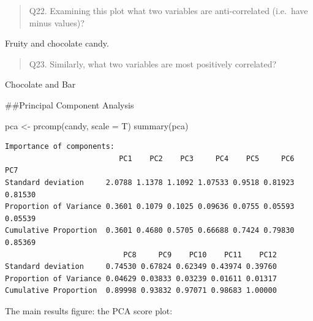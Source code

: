 \documentclass[
  letterpaper,
  DIV=11,
  numbers=noendperiod]{scrartcl}
\newenvironment{Shaded}{\begin{snugshade}}{\end{snugshade}}
\newcommand{\AttributeTok}[1]{\textcolor[rgb]{0.40,0.45,0.13}{#1}}
\newcommand{\DecValTok}[1]{\textcolor[rgb]{0.68,0.00,0.00}{#1}}
\newcommand{\FunctionTok}[1]{\textcolor[rgb]{0.28,0.35,0.67}{#1}}
\newcommand{\NormalTok}[1]{\textcolor[rgb]{0.00,0.23,0.31}{#1}}
\newcommand{\OtherTok}[1]{\textcolor[rgb]{0.00,0.23,0.31}{#1}}
\newcommand{\SpecialCharTok}[1]{\textcolor[rgb]{0.37,0.37,0.37}{#1}}
\newcommand{\StringTok}[1]{\textcolor[rgb]{0.13,0.47,0.30}{#1}}
\begin{document}
\begin{quote}
Q22. Examining this plot what two variables are anti-correlated
(i.e.~have minus values)?
\end{quote}

Fruity and chocolate candy.

\begin{quote}
Q23. Similarly, what two variables are most positively correlated?
\end{quote}

Chocolate and Bar

\#\#Principal Component Analysis

\begin{Shaded}
\begin{Highlighting}[]
\NormalTok{pca }\OtherTok{\textless{}{-}} \FunctionTok{prcomp}\NormalTok{(candy, }\AttributeTok{scale =}\NormalTok{ T)}
\FunctionTok{summary}\NormalTok{(pca)}
\end{Highlighting}
\end{Shaded}

\begin{verbatim}
Importance of components:
                          PC1    PC2    PC3     PC4    PC5     PC6     PC7
Standard deviation     2.0788 1.1378 1.1092 1.07533 0.9518 0.81923 0.81530
Proportion of Variance 0.3601 0.1079 0.1025 0.09636 0.0755 0.05593 0.05539
Cumulative Proportion  0.3601 0.4680 0.5705 0.66688 0.7424 0.79830 0.85369
                           PC8     PC9    PC10    PC11    PC12
Standard deviation     0.74530 0.67824 0.62349 0.43974 0.39760
Proportion of Variance 0.04629 0.03833 0.03239 0.01611 0.01317
Cumulative Proportion  0.89998 0.93832 0.97071 0.98683 1.00000
\end{verbatim}

The main results figure: the PCA score plot:

\begin{Shaded}
\end{Shaded}
\end{document}
